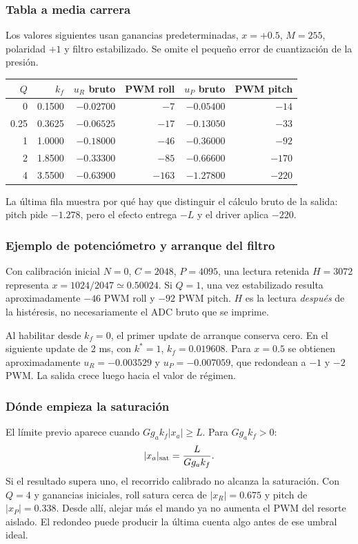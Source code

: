 \subsubsection{Tabla a media carrera}
Los valores siguientes usan ganancias predeterminadas, $x=+0.5$, $M=255$, polaridad $+1$ y filtro estabilizado. Se omite el pequeño error de cuantización de la presión.
\begin{center}
\begin{tabular}{rrrrrr}
\toprule
$Q$ & $k_f$ & $u_R$ bruto & PWM roll & $u_P$ bruto & PWM pitch\\
\midrule
0 & 0.1500 & $-0.02700$ & $-7$ & $-0.05400$ & $-14$\\
0.25 & 0.3625 & $-0.06525$ & $-17$ & $-0.13050$ & $-33$\\
1 & 1.0000 & $-0.18000$ & $-46$ & $-0.36000$ & $-92$\\
2 & 1.8500 & $-0.33300$ & $-85$ & $-0.66600$ & $-170$\\
4 & 3.5500 & $-0.63900$ & $-163$ & $-1.27800$ & $-220$\\
\bottomrule
\end{tabular}
\end{center}
La última fila muestra por qué hay que distinguir el cálculo bruto de la salida: pitch pide $-1.278$, pero el efecto entrega $-L$ y el driver aplica $-220$.

\subsubsection{Ejemplo de potenciómetro y arranque del filtro}
Con calibración inicial $N=0$, $C=2048$, $P=4095$, una lectura retenida $H=3072$ representa $x=1024/2047\simeq0.50024$. Si $Q=1$, una vez estabilizado resulta aproximadamente $-46$ PWM roll y $-92$ PWM pitch. $H$ es la lectura \emph{después} de la histéresis, no necesariamente el ADC bruto que se imprime.

Al habilitar desde $k_f=0$, el primer update de arranque conserva cero. En el siguiente update de 2 ms, con $k^*=1$, $k_f=0.019608$. Para $x=0.5$ se obtienen aproximadamente $u_R=-0.003529$ y $u_P=-0.007059$, que redondean a $-1$ y $-2$ PWM. La salida crece luego hacia el valor de régimen.

\subsubsection{Dónde empieza la saturación}
El límite previo aparece cuando $Gg_ak_f|x_a|\ge L$. Para $Gg_ak_f>0$:
\begin{equation}
|x_a|_{\rm sat}=\frac{L}{Gg_ak_f}.
\end{equation}
Si el resultado supera uno, el recorrido calibrado no alcanza la saturación. Con $Q=4$ y ganancias iniciales, roll satura cerca de $|x_R|=0.675$ y pitch de $|x_P|=0.338$. Desde allí, alejar más el mando ya no aumenta el PWM del resorte aislado. El redondeo puede producir la última cuenta algo antes de ese umbral ideal.

